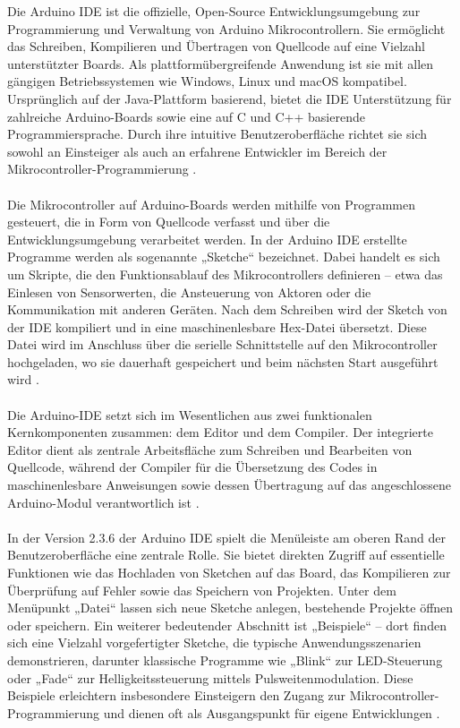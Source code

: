 Die Arduino IDE ist die offizielle, Open-Source Entwicklungsumgebung zur Programmierung und Verwaltung von Arduino Mikrocontrollern. Sie ermöglicht das Schreiben, Kompilieren und Übertragen von Quellcode auf eine Vielzahl unterstützter Boards. Als plattformübergreifende Anwendung ist sie mit allen gängigen Betriebssystemen wie Windows, Linux und macOS kompatibel. Ursprünglich auf der Java-Plattform basierend, bietet die IDE Unterstützung für zahlreiche Arduino-Boards sowie eine auf C und C++ basierende Programmiersprache. Durch ihre intuitive Benutzeroberfläche richtet sie sich sowohl an Einsteiger als auch an erfahrene Entwickler im Bereich der Mikrocontroller-Programmierung \cite{Fezari:2018}.
\\\\ 
Die Mikrocontroller auf Arduino-Boards werden mithilfe von Programmen gesteuert, die in Form von Quellcode verfasst und über die Entwicklungsumgebung verarbeitet werden. In der Arduino IDE erstellte Programme werden als sogenannte „Sketche“ bezeichnet. Dabei handelt es sich um Skripte, die den Funktionsablauf des Mikrocontrollers definieren – etwa das Einlesen von Sensorwerten, die Ansteuerung von Aktoren oder die Kommunikation mit anderen Geräten. Nach dem Schreiben wird der Sketch von der IDE kompiliert und in eine maschinenlesbare Hex-Datei übersetzt. Diese Datei wird im Anschluss über die serielle Schnittstelle auf den Mikrocontroller hochgeladen, wo sie dauerhaft gespeichert und beim nächsten Start ausgeführt wird \cite{Fezari:2018}.
\\\\ 
Die Arduino-IDE setzt sich im Wesentlichen aus zwei funktionalen Kernkomponenten zusammen: dem Editor und dem Compiler. Der integrierte Editor dient als zentrale Arbeitsfläche zum Schreiben und Bearbeiten von Quellcode, während der Compiler für die Übersetzung des Codes in maschinenlesbare Anweisungen sowie dessen Übertragung auf das angeschlossene Arduino-Modul verantwortlich ist \cite{Fezari:2018}.
\\\\ 
In der Version 2.3.6 der Arduino IDE spielt die Menüleiste am oberen Rand der Benutzeroberfläche eine zentrale Rolle. Sie bietet direkten Zugriff auf essentielle Funktionen wie das Hochladen von Sketchen auf das Board, das Kompilieren zur Überprüfung auf Fehler sowie das Speichern von Projekten. Unter dem Menüpunkt „Datei“ lassen sich neue Sketche anlegen, bestehende Projekte öffnen oder speichern. Ein weiterer bedeutender Abschnitt ist „Beispiele“ – dort finden sich eine Vielzahl vorgefertigter Sketche, die typische Anwendungsszenarien demonstrieren, darunter klassische Programme wie „Blink“ zur LED-Steuerung oder „Fade“ zur Helligkeitssteuerung mittels Pulsweitenmodulation. Diese Beispiele erleichtern insbesondere Einsteigern den Zugang zur Mikrocontroller-Programmierung und dienen oft als Ausgangspunkt für eigene Entwicklungen \cite{Fezari:2018}. 

